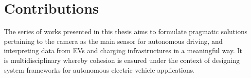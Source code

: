 

%

\section{Contributions}
The series of works presented in this thesis aims to formulate pragmatic solutions pertaining to the camera as the main sensor for autonomous driving, and interpreting data from EVs and charging infrastructures in a meaningful way. It is multidisciplinary whereby cohesion is ensured under the context of designing system frameworks for autonomous electric vehicle applications. 

